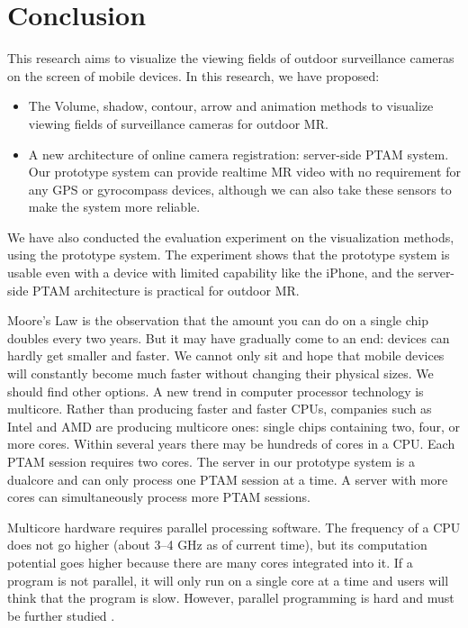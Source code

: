 \chapter{Conclusion}
\label{Chapter5}

This research aims to visualize the viewing fields of outdoor surveillance cameras on the screen of mobile devices. In this research, we have proposed:

\begin{itemize}
	\item The Volume, shadow, contour, arrow and animation methods to visualize viewing fields of surveillance cameras for outdoor MR.
	\item A new architecture of online camera registration: server-side PTAM \cite{Reference12} system. Our prototype system can provide realtime MR video with no requirement for any GPS or gyrocompass devices, although we can also take these sensors to make the system more reliable.
\end{itemize}

We have also conducted the evaluation experiment on the visualization methods, using the prototype system. The experiment shows that the prototype system is usable even with a device with limited capability like the iPhone, and the server-side PTAM architecture is practical for outdoor MR.

Moore's Law is the observation that the amount you can do on a single chip doubles every two years. But it may have gradually come to an end: devices can hardly get smaller and faster. We cannot only sit and hope that mobile devices will constantly become much faster without changing their physical sizes. We should find other options. A new trend in computer processor technology is multicore. Rather than producing faster and faster CPUs, companies such as Intel and AMD are producing multicore ones: single chips containing two, four, or more cores. Within several years there may be hundreds of cores in a CPU. Each PTAM session requires two cores. The server in our prototype system is a dualcore and can only process one PTAM session at a time. A server with more cores can simultaneously process more PTAM sessions.

Multicore hardware requires parallel processing software. The frequency of a CPU does not go higher (about 3--4 GHz as of current time), but its computation potential goes higher because there are many cores integrated into it. If a program is not parallel, it will only run on a single core at a time and users will think that the program is slow. However, parallel programming is hard and must be further studied \cite{Reference17}.

